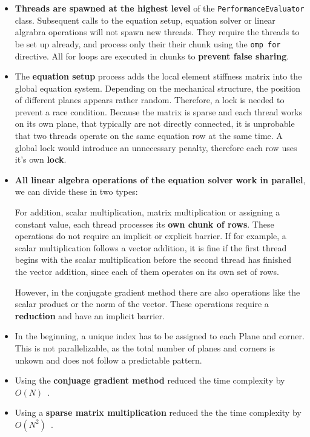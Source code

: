 \documentclass[12pt]{article}
\begin{document}
\begin{itemize}
    \item \textbf{Threads are spawned at the highest level} of the \texttt{PerformanceEvaluator} class. Subsequent calls to the equation setup, equation solver or linear algrabra operations will not spawn new threads. They require the threads to be set up already, and process only their their chunk using the \texttt{omp for} directive. All for loops are executed in chunks to \textbf{prevent false sharing}.
    \item The \textbf{equation setup} process adds the local element stiffness matrix into the global equation system. Depending on the mechanical structure, the position of different planes appears rather random. Therefore, a lock is needed to prevent a race condition. Because the matrix is sparse and each thread works on its own plane, that typically are not directly connected, it is unprobable that two threads operate on the same equation row at the same time. A global lock would introduce an unnecessary penalty, therefore each row uses it's own \textbf{lock}.
    \item \textbf{All linear algebra operations of the equation solver work in parallel}, we can divide these in two types:
    
    For addition, scalar multiplication, matrix multiplication or assigning a constant value, each thread processes its \textbf{own chunk of rows}. These operations do not require an implicit or explicit barrier. If for example, a scalar multiplication follows a vector addition, it is fine if the first thread begins with the scalar multiplication before the second thread has finished the vector addition, since each of them operates on its own set of rows.
    
    However, in the conjugate gradient method there are also operations like the scalar product or the norm of the vector. These operations require a \textbf{reduction} and have an implicit barrier.
    \item In the beginning, a unique index has to be assigned to each Plane and corner. This is not parallelizable, as the total number of planes and corners is unkown and does not follow a predictable pattern.
    \item Using the \textbf{conjuage gradient method} reduced the time complexity by $O(N)$~\cite{ProgressReport}.
    \item Using a \textbf{sparse matrix multiplication} reduced the the time complexity by $O(N^2)$~\cite{ProgressReport}. 
\end{itemize}
\end{document}
